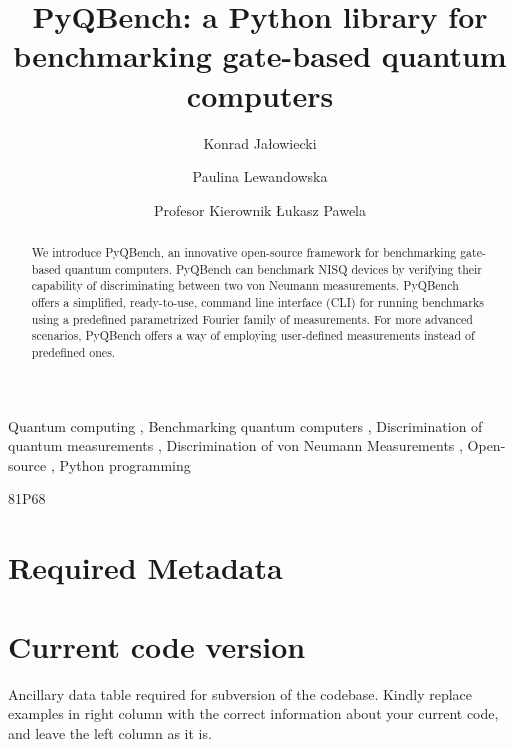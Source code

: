 \documentclass[preprint,12pt, a4paper]{elsarticle}
\newcommand{\1}{{\rm 1\hspace{-0.9mm}l}}
\begin{document}
\begin{frontmatter}

\title{PyQBench: a Python library for benchmarking gate-based quantum computers}

\author{Konrad Jałowiecki}

\author{Paulina Lewandowska}
\author{Profesor Kierownik \L ukasz Pawela}

\address{Institute of Theoretical and Applied Informatics, Polish Academy
	of Sciences, Ba{\l}tycka 5, 44-100 Gliwice, Poland}

\begin{abstract}
We introduce PyQBench, an innovative open-source framework for benchmarking 
gate-based quantum computers. PyQBench can benchmark NISQ devices by verifying their capability of
discriminating between two von Neumann measurements. PyQBench offers a simplified, ready-to-use,
command line interface (CLI) for running benchmarks using a predefined parametrized Fourier
family of measurements. For more advanced scenarios, PyQBench offers a way of employing user-defined
measurements instead of predefined ones.

\end{abstract}

\begin{keyword}
Quantum computing \sep
Benchmarking quantum computers \sep 
Discrimination of quantum measurements \sep 
Discrimination of von Neumann Measurements \sep
Open-source \sep
Python programming

		
\MSC 81P68

\end{keyword}

\end{frontmatter}

\section*{Required Metadata}
\label{}

\section*{Current code version}
\label{}

Ancillary data table required for subversion of the codebase. Kindly replace 
examples in right column with the correct information about your current code, 
and leave the left column as it is.
\end{document}
